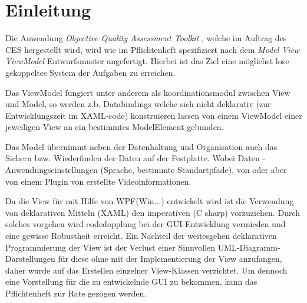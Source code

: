 \chapter{Einleitung}

Die Anwendung \emph{Objective Quality Assessment Toolkit} , welche im Auftrag des CES hergestellt wird, wird wie im Pflichtenheft spezifiziert nach dem \emph{Model View ViewModel} Entwurfsmuster angefertigt.
Hierbei ist das Ziel eine möglichst lose gekoppeltes System der Aufgaben zu erreichen.

Das ViewModel fungiert unter anderem als koordinationsmodul
zwischen View und Model, so werden z.b. Databindings welche
sich nicht deklarativ (zur Entwicklungszeit im XAML-code)
konstruieren lassen von einem ViewModel einer jeweiligen View
an ein bestimmtes ModelElement gebunden.

Das Model übernimmt neben der Datenhaltung und Organisation
auch das Sichern bzw. Wiederfinden der Daten auf der Festplatte.
Wobei Daten \projektTitel-Anwendungseinstellungen (Sprache, bestimmte
Standartpfade), von \projektTitel oder
aber von einem Plugin von \projektTitel erstellte Videoinformationen.

Da die View für \projektTitel mit Hilfe von WPF(Win...) entwickelt 
wird ist die Verwendung von deklarativen Mitteln (XAML) den
imperativen (C sharp) vorzuziehen. Durch solches vorgehen wird
codedopplung bei der GUI-Entwicklung vermieden und eine
gewisse Robustheit erreicht. Ein Nachteil der weitesgehen deklarativen
Programmierung der View ist der Verlust einer Sinnvollen
UML-Diagramm-Darstellungen für diese ohne mit der Implementierung 
der View anzufangen, daher wurde auf das Erstellen einzelner View-Klassen
verzichtet. Um dennoch eine Vorstellung für die zu entwickelnde GUI 
zu bekommen, kann das Pflichtenheft zur Rate gezogen werden.
